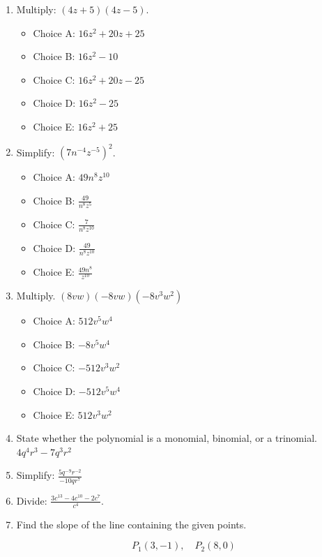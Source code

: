 \documentclass{ximera}
\begin{document}
\begin{enumerate}
\item Multiply: $(4 z+5)(4 z-5)$.

\begin{itemize}
\item Choice A: $16 z^{2}+20 z+25$
\item Choice B: $16 z^{2}-10$
\item Choice C: $16 z^{2}+20 z-25$
\item Choice D: $16 z^{2}-25$
\item Choice E: $16 z^{2}+25$
\end{itemize}

\item Simplify: $\left(7 n^{-4} z^{-5}\right)^{2}$.

\begin{itemize}
\item Choice A: $49 n^{8} z^{10}$
\item Choice B: $\frac{49}{n^{8} z^{5}}$
\item Choice C: $\frac{7}{n^{8} z^{10}}$
\item Choice D: $\frac{49}{n^{8} z^{10}}$
\item Choice E: $\frac{49 n^{8}}{z^{10}}$
\end{itemize}

\item Multiply.
$(8 v w)(-8 v w)\left(-8 v^{3} w^{2}\right)$

\begin{itemize}
\item Choice A: $512 v^{5} w^{4}$
\item Choice B: $-8 v^{5} w^{4}$
\item Choice C: $-512 v^{3} w^{2}$
\item Choice D: $-512 v^{5} w^{4}$
\item Choice E: $512 v^{3} w^{2}$
\end{itemize}

\item State whether the polynomial is a monomial, binomial, or a trinomial. $4 q^{4} r^{3}-7 q^{3} r^{2}$

\item Simplify:
$\frac{5 q^{-9} r^{-2}}{-10 q r^{7}}$

\item Divide: $\frac{3 c^{13}-4 c^{10}-2 c^{7}}{c^{4}}$.

\item Find the slope of the line containing the given points.

$$P_{1}(3,-1), \quad P_{2}(8,0)$$



\end{enumerate}
\end{document}
